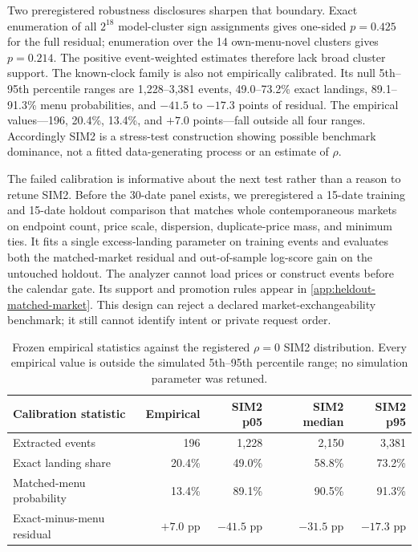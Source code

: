 \documentclass[11pt]{article}
\newcommand{\1}{\mathbf{1}}
\begin{document}
{Two preregistered robustness disclosures sharpen that boundary.  Exact enumeration
of all $2^{18}$ model-cluster sign assignments gives one-sided $p=0.425$ for the
full residual; enumeration over the 14 own-menu-novel clusters gives $p=0.214$.
The positive event-weighted estimates therefore lack broad cluster support.  The
known-clock family is also not empirically calibrated.  Its null 5th--95th
percentile ranges are 1,228--3,381 events, 49.0--73.2\% exact landings, 89.1--91.3\%
menu probabilities, and $-41.5$ to $-17.3$ points of residual.  The empirical
values---196, 20.4\%, 13.4\%, and $+7.0$ points---fall outside all four ranges.
Accordingly SIM2 is a stress-test construction showing possible benchmark
dominance, not a fitted data-generating process or an estimate of $\rho$.

The failed calibration is informative about the next test rather than a reason to
retune SIM2.  Before the 30-date panel exists, we preregistered a 15-date training
and 15-date holdout comparison that matches whole contemporaneous markets on
endpoint count, price scale, dispersion, duplicate-price mass, and minimum ties.
It fits a single excess-landing parameter on training events and evaluates both
the matched-market residual and out-of-sample log-score gain on the untouched
holdout.  The analyzer cannot load prices or construct events before the calendar
gate.  Its support and promotion rules appear in
\cref{app:heldout-matched-market}.  This design can reject a declared
market-exchangeability benchmark; it still cannot identify intent or private
request order.

\begin{table}[H]
\centering
\small
\begin{tabular}{lrrrr}
\toprule
Calibration statistic & Empirical & SIM2 p05 & SIM2 median & SIM2 p95 \\
\midrule
Extracted events & 196 & 1,228 & 2,150 & 3,381 \\
Exact landing share & 20.4\% & 49.0\% & 58.8\% & 73.2\% \\
Matched-menu probability & 13.4\% & 89.1\% & 90.5\% & 91.3\% \\
Exact-minus-menu residual & $+7.0$ pp & $-41.5$ pp & $-31.5$ pp & $-17.3$ pp \\
\bottomrule
\end{tabular}
\caption{Frozen empirical statistics against the registered $\rho=0$ SIM2
distribution.  Every empirical value is outside the simulated 5th--95th
percentile range; no simulation parameter was retuned.}
\label{tab:sim2calibration}
\end{table}

}
\end{document}
